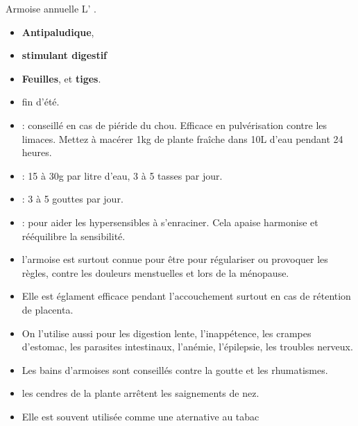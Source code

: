 {Armoise annuelle}
{%
    L' .\\

    
}
{%
    \begin{itemize}[label = \bcplume]
        \item \textbf{Antipaludique}, 
        \item \textbf{stimulant digestif}
    \end{itemize}
}
{%
    \begin{itemize}[label = \bcplume]
        \item \textbf{Feuilles}, et \textbf{tiges}.
        \item fin d'été.
    \end{itemize}
}
{%
    \begin{itemize}[label = \bccrayon]
        \item {} : conseillé en cas de piéride du chou. Efficace en pulvérisation contre les limaces. Mettez à macérer 1kg de plante fraîche dans 10L d'eau pendant 24 heures.
        \item {} : 15 à 30g par litre d'eau, 3 à 5 tasses par jour.
        \item {} : 3 à 5 gouttes par jour.
        \item {} : pour aider les hypersensibles à s'enraciner. Cela apaise harmonise et rééquilibre la sensibilité.
    \end{itemize}
}
{%
\begin{itemize}[label = \bccrayon]
    \item l'armoise est surtout connue pour être  pour régulariser ou provoquer les règles, contre les douleurs menstuelles et lors de la ménopause.
    \item Elle est églament efficace pendant l'accouchement surtout en cas de rétention de placenta.
    \item On l'utilise aussi pour les digestion lente, l'inappétence, les crampes d'estomac, les parasites intestinaux, l'anémie, l'épilepsie, les troubles nerveux.
\end{itemize}
}
{%
\begin{itemize}[label = \bccrayon]
    \item Les bains d'armoises sont conseillés contre la goutte et les rhumatismes.
    \item les cendres de la plante arrêtent les saignements de nez.
    \item Elle est souvent utilisée comme une aternative au tabac
\end{itemize}
}
